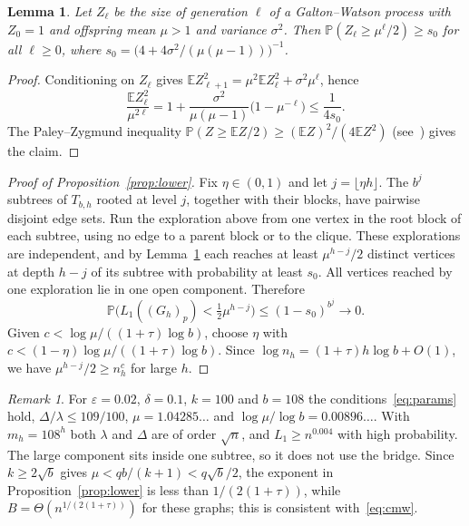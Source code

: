 \documentclass[11pt]{amsart}
\newtheorem{lemma}[theorem]{Lemma}
\theoremstyle{remark}
\newtheorem{remark}[theorem]{Remark}
\newcommand{\PP}{\mathbb{P}}
\newcommand{\EE}{\mathbb{E}}
\begin{document}
\begin{lemma}\label{lem:secondmoment}
Let $Z_\ell$ be the size of generation $\ell$ of a Galton--Watson process with $Z_0=1$ and offspring mean $\mu>1$ and
variance $\sigma^2$. Then $\PP(Z_\ell\ge\mu^\ell/2)\ge s_0$ for all $\ell\ge0$, where
$s_0=\bigl(4+4\sigma^2/(\mu(\mu-1))\bigr)^{-1}$.
\end{lemma}

\begin{proof}
Conditioning on $Z_\ell$ gives $\EE Z_{\ell+1}^2=\mu^2\EE Z_\ell^2+\sigma^2\mu^\ell$, hence
\[
\frac{\EE Z_\ell^2}{\mu^{2\ell}}=1+\frac{\sigma^2}{\mu(\mu-1)}\bigl(1-\mu^{-\ell}\bigr)\le\frac1{4s_0}.
\]
The Paley--Zygmund inequality $\PP(Z\ge\EE Z/2)\ge(\EE Z)^2/(4\EE Z^2)$ (see~\cite[Section~5.5]{LP16}) gives the claim.
\end{proof}

\begin{proof}[Proof of Proposition~\ref{prop:lower}]
Fix $\eta\in(0,1)$ and let $j=\lfloor\eta h\rfloor$. The $b^j$ subtrees of $T_{b,h}$ rooted at level $j$, together
with their blocks, have pairwise disjoint edge sets. Run the exploration above from one vertex in the root block of each
subtree, using no edge to a parent block or to the clique. These explorations are independent, and by
Lemma~\ref{lem:secondmoment} each reaches at least $\mu^{h-j}/2$ distinct vertices at depth $h-j$ of its subtree with
probability at least $s_0$. All vertices reached by one exploration lie in one open component. Therefore
\[
\PP\bigl(L_1((G_h)_p)<\tfrac12\mu^{h-j}\bigr)\le(1-s_0)^{b^j}\to0.
\]
Given $c<\log\mu/((1+\tau)\log b)$, choose $\eta$ with $c<(1-\eta)\log\mu/((1+\tau)\log b)$. Since $\log
n_h=(1+\tau)h\log b+O(1)$, we have $\mu^{h-j}/2\ge n_h^c$ for large $h$.
\end{proof}

\begin{remark}\label{rem:example}
For $\varepsilon=0.02$, $\delta=0.1$, $k=100$ and $b=108$ the conditions~\eqref{eq:params} hold, $\Delta/\lambda\le
109/100$, $\mu=1.04285\ldots$ and $\log\mu/\log b=0.00896\ldots$. With $m_h=108^h$ both $\lambda$ and $\Delta$ are of
order $\sqrt{n}$, and $L_1\ge n^{0.004}$ with high probability. The large component sits inside one subtree, so it does
not use the bridge. Since $k\ge2\sqrt b$ gives $\mu<qb/(k+1)<q\sqrt b/2$, the exponent in
Proposition~\ref{prop:lower} is less than $1/(2(1+\tau))$, while $B=\Theta(n^{1/(2(1+\tau))})$ for these graphs; this
is consistent with~\eqref{eq:cmw}.
\end{remark}
\end{document}
